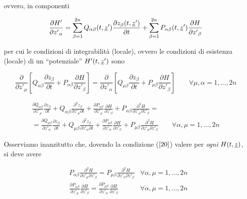 ovvero, in componenti

\begin{equation}
  \frac{\partial H'}{\partial {z'}_{\alpha} } = \sum_{\beta = 1}^{2n} Q_{\alpha \beta}(t, \uline{z}') \frac{\partial z_\beta(t, \uline{z}')}{\partial t} + \sum_{\beta = 1}^{2n} P_{\alpha\beta}(t, \uline{z}') \frac{\partial H}{\partial {z'}_\beta}
\end{equation}

per cui le condizioni di integrabilità (locale), ovvero le condizioni di esistenza (locale) di un ``potenziale'' $ H' (t, \uline{z}') $ sono

\begin{equation}
  \frac{\partial}{\partial z'_\mu} \left[ Q_{\alpha \beta} \frac{\partial z_\beta}{\partial t} + P_{\alpha \beta} \frac{\partial H}{\partial z'_\beta} \right] = \frac{\partial}{\partial z'_\alpha} \left[ Q_{\mu \beta} \frac{\partial z_\beta}{\partial t} + P_{\mu \beta} \frac{\partial H}{\partial z'_\beta} \right] \qquad \forall \mu,\alpha = 1, \dots , 2n
\end{equation}

\begin{equation} \label{20}
  \begin{split}
    \frac{\partial Q_{\alpha\beta} }{\partial z'_\mu} \frac{\partial z_\beta }{\partial t} + Q_{\alpha \beta} \frac{\partial^2 z_\beta}{\partial z'_\mu \partial t} + \frac{\partial P_{\alpha \beta} }{\partial z'_\mu} \frac{\partial H }{\partial z'_\beta } + P_{\alpha \beta} \frac{\partial^2 H}{\partial z'_\mu \partial z'_\beta} =\\
    = \frac{\partial Q_{\mu \beta} }{\partial z'_\alpha} \frac{\partial z_\beta }{\partial t} + Q_{\mu \beta} \frac{\partial^2 z_\beta}{\partial z'_\alpha \partial t} + \frac{\partial P_{\mu \beta} }{\partial z'_\alpha} \frac{\partial H }{\partial z'_\beta } + P_{\mu \beta} \frac{\partial^2 H}{\partial z'_\alpha \partial z'_\beta} \qquad \forall \alpha, \mu = 1, \dots , 2n
  \end{split}
\end{equation}

Osserviamo inanzitutto che, dovendo la condizione ($ \ref{20} $) valere per \textit{ogni} $ H (t, \uline{z}) $, si deve avere

\begin{subequations}
  \begin{align}
    & P_{\alpha \beta} \frac{\partial^2 H}{\partial z'_\mu \partial z'_\beta} = P_{\mu \beta} \frac{\partial^2 H}{\partial z'_\alpha \partial z'_\beta} & \forall \alpha, \mu = 1, \dots , 2n\\
    & \frac{\partial P_{\alpha \beta}}{\partial z'_\mu} \frac{\partial H}{\partial z'_\beta} = \frac{\partial P_{\mu \beta}}{\partial z'_\alpha} \frac{\partial H}{\partial z'_\beta} & \forall \alpha, \mu = 1, \dots , 2n
  \end{align}
\end{subequations}

